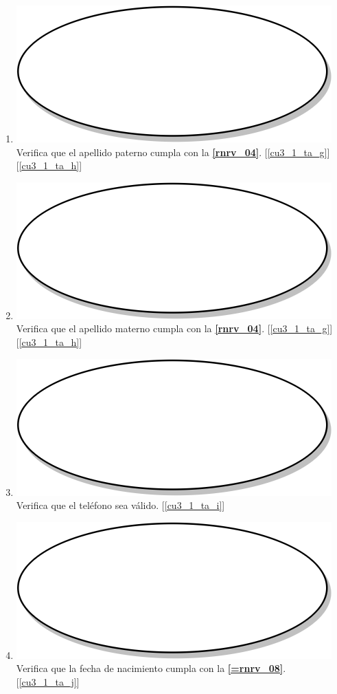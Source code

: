 \begin{enumerate}
  \item {\includegraphics[scale=.05]{Capitulo3/img/proceso.png} Verifica que el apellido paterno cumpla con la \textbf{\ref{rnrv_04}}. [\ref{cu3_1_ta_g}] [\ref{cu3_1_ta_h}]}
  \item {\includegraphics[scale=.05]{Capitulo3/img/proceso.png} Verifica que el apellido materno cumpla con la \textbf{\ref{rnrv_04}}. [\ref{cu3_1_ta_g}] [\ref{cu3_1_ta_h}]}
  \item {\includegraphics[scale=.05]{Capitulo3/img/proceso.png} Verifica que el teléfono sea válido. [\ref{cu3_1_ta_i}]}
  \item {\includegraphics[scale=.05]{Capitulo3/img/proceso.png} Verifica que la fecha de nacimiento cumpla con la \textbf{\ref{=rnrv_08}}. [\ref{cu3_1_ta_j}]}

\end{enumerate}
